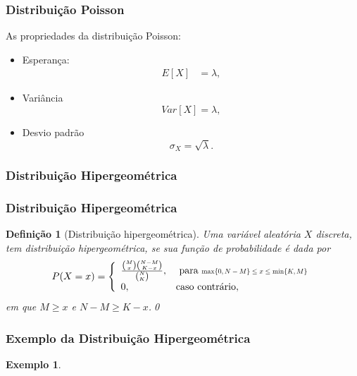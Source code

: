 \documentclass{beamer}
\theoremstyle{plain}
\newtheorem{exem}{Exemplo}
\newtheorem{defi}{Definição}
\begin{document}
  \begin{frame}
  	\frametitle{Distribuição Poisson}
  	As propriedades da distribuição Poisson:
  	\begin{itemize}
  		\item Esperança:
  		\begin{align}
  		E[X] & = \lambda,
  		\end{align}
  		\item Variância
  		\begin{equation}
  		Var[X] = \lambda,
  		\end{equation}
  		\item Desvio padrão
  		\begin{equation}
  		\sigma_X = \sqrt{\lambda}.
  		\end{equation}
  	\end{itemize}
  \end{frame}


  \begin{frame}
  	\frametitle{Distribuição Hipergeométrica}
  	\begin{center}
  	\end{center}
  \end{frame}

  \begin{frame}
  	\frametitle{Distribuição Hipergeométrica}
  	  \begin{defi}[Distribuição hipergeométrica]
  	  	Uma variável aleatória $X$ discreta, tem distribuição hipergeométrica, se sua função de probabilidade é dada por
  	  	\begin{eqnarray}\label{eq:hipergeo}
  	  	P(X=x)=\left\lbrace \begin{array}{ll}
  	  	\frac{\binom{M}{x}\binom{N-M}{K-x}}{\binom{N}{K}},& \textrm{ para } \scalebox{0.7}{$\max\{ 0, N-M\} \leq x \leq \min\{K, M\}$}\\
  	  	0,& \textrm{caso contrário}, \label{eq:hg}
  	  	\end{array}\right.
  	  	\end{eqnarray}
  	  	em que $M \geq x$ e $N-M \geq K-x$.\qed
  	  \end{defi}
  \end{frame}

  \begin{frame}
  	\frametitle{Exemplo da Distribuição Hipergeométrica}
    \begin{exem}
    	\begin{center}
    	\end{center}
    \end{exem}
  \end{frame}
\end{document}
